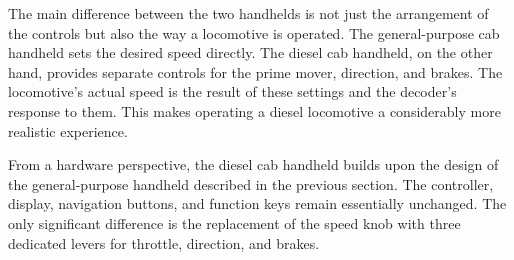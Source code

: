 \begin{center}
\end{center}

The main difference between the two handhelds is not just the arrangement of the controls but also the way a locomotive is operated. The general-purpose cab handheld sets the desired speed directly. The diesel cab handheld, on the other hand, provides separate controls for the prime mover, direction, and brakes. The locomotive’s actual speed is the result of these settings and the decoder’s response to them. This makes operating a diesel locomotive a considerably more realistic experience.

From a hardware perspective, the diesel cab handheld builds upon the design of the general-purpose handheld described in the previous section. The controller, display, navigation buttons, and function keys remain essentially unchanged. The only significant difference is the replacement of the speed knob with three dedicated levers for throttle, direction, and brakes.

